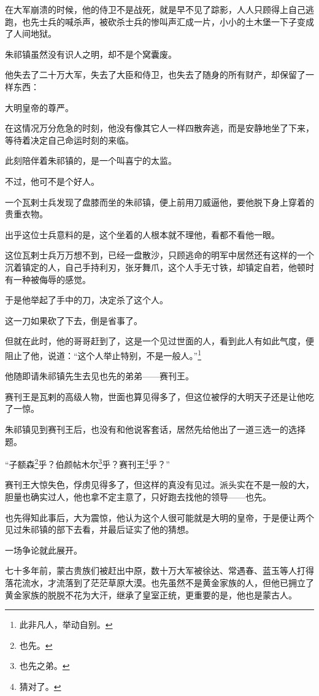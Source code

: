 \begin{multicols}{\theparacolNo}
在大军崩溃的时候，他的侍卫不是战死，就是早不见了踪影，人人只顾得上自己逃跑，也先士兵的喊杀声，被砍杀士兵的惨叫声汇成一片，小小的土木堡一下子变成了人间地狱。

朱祁镇虽然没有识人之明，却不是个窝囊废。

他失去了二十万大军，失去了大臣和侍卫，也失去了随身的所有财产，却保留了一样东西：

大明皇帝的尊严。

在这情况万分危急的时刻，他没有像其它人一样四散奔逃，而是安静地坐了下来，等待着决定自己命运时刻的来临。

此刻陪伴着朱祁镇的，是一个叫喜宁的太监。

不过，他可不是个好人。

一个瓦剌士兵发现了盘膝而坐的朱祁镇，便上前用刀威逼他，要他脱下身上穿着的贵重衣物。

出乎这位士兵意料的是，这个坐着的人根本就不理他，看都不看他一眼。

这位瓦剌士兵万万想不到，已经一盘散沙，只顾逃命的明军中居然还有这样的一个沉着镇定的人，自己手持利刃，张牙舞爪，这个人手无寸铁，却镇定自若，他顿时有一种被侮辱的感觉。

于是他举起了手中的刀，决定杀了这个人。

这一刀如果砍了下去，倒是省事了。

但就在此时，他的哥哥赶到了，这是一个见过世面的人，看到此人有如此气度，便阻止了他，说道：“这个人举止特别，不是一般人。”\footnote{此非凡人，举动自别。}

他随即请朱祁镇先生去见也先的弟弟——赛刊王。

赛刊王是瓦剌的高级人物，世面也算见得多了，但这位被俘的大明天子还是让他吃了一惊。

朱祁镇见到赛刊王后，也没有和他说客套话，居然先给他出了一道三选一的选择题。

“子额森\footnote{也先。}乎？伯颜帖木尔\footnote{也先之弟。}乎？赛刊王\footnote{猜对了。}乎？”

赛刊王大惊失色，俘虏见得多了，但这样的真没有见过。派头实在不是一般的大，胆量也确实过人，他也拿不定主意了，只好跑去找他的领导——也先。

也先得知此事后，大为震惊，他认为这个人很可能就是大明的皇帝，于是便让两个见过朱祁镇的部下去看，并最后证实了他的猜想。

一场争论就此展开。

七十多年前，蒙古贵族们被赶出中原，数十万大军被徐达、常遇春、蓝玉等人打得落花流水，才流落到了茫茫草原大漠。也先虽然不是黄金家族的人，但他已拥立了黄金家族的脱脱不花为大汗，继承了皇室正统，更重要的是，他也是蒙古人。


\end{multicols}
